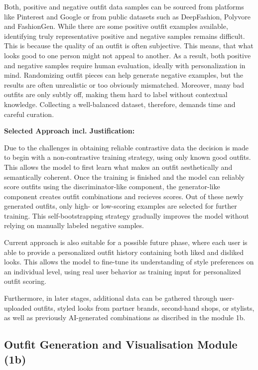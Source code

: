 Both, positive and negative outfit data samples can be sourced from platforms like Pinterest and Google or from public datasets such as DeepFashion, Polyvore and FashionGen. While there are some positive outfit examples available, identifying truly representative positive and negative samples remains difficult. This is because the quality of an outfit is often subjective. This means, that what looks good to one person might not appeal to another. As a result, both positive and negative samples require human evaluation, ideally with personalization in mind. Randomizing outfit pieces can help generate negative examples, but the results are often unrealistic or too obviously mismatched. Moreover, many bad outfits are only subtly off, making them hard to label without contextual knowledge. Collecting a well-balanced dataset, therefore, demands time and careful curation.

\vspace{0.5cm}

\textbf{Selected Approach incl. Justification:}

\vspace{0.5cm}

Due to the challenges in obtaining reliable contrastive data the decision is made to begin with a non-contrastive training strategy, using only known good outfits. This allows the model to first learn what makes an outfit aesthetically and semantically coherent. Once the training is finished and the model can reliably score outfits using the discriminator-like component, the generator-like component creates outfit combinations and recieves scores. Out of these newly generated outfits, only high- or low-scoring examples are selected for further training. This self-bootstrapping strategy gradually improves the model without relying on manually labeled negative samples.

Current approach is also suitable for a possible future phase, where each user is able to provide a personalized outfit history containing both liked and disliked looks. This allows the model to fine-tune its understanding of style preferences on an individual level, using real user behavior as training input for personalized outfit scoring.

Furthermore, in later stages, additional data can be gathered through user-uploaded outfits, styled looks from partner brands, second-hand shops, or stylists, as well as previously \acs{AI}-generated combinations as discribed in the module 1b.

\subsection{Outfit Generation and Visualisation Module (1b)}

